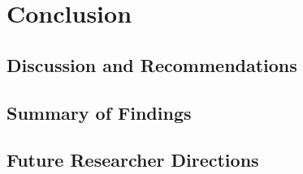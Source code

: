 
\chapter{Conclusion}\label{chapter:conclusion}

\section{Discussion and Recommendations}
\section{Summary of Findings}
\section{Future Researcher Directions}